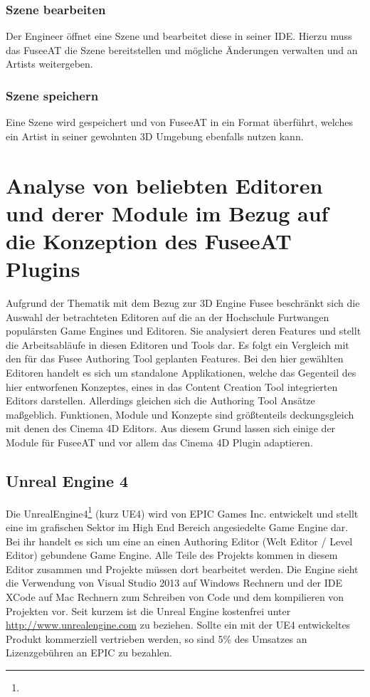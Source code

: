 \documentclass[pagesize, paper=a4, fontsize=12pt, titlepage=true, headings=small, headnosepline, abstractoff, liststotoc, nochapterprefix, plainheadsepline, twoside]{scrreprt}
\begin{document}
\subsubsection{Szene bearbeiten}
Der Engineer öffnet eine Szene und bearbeitet diese in seiner IDE. Hierzu muss das FuseeAT die Szene bereitstellen und mögliche Änderungen verwalten und an Artists weitergeben.

\subsubsection{Szene speichern}
Eine Szene wird gespeichert und von FuseeAT in ein Format überführt, welches ein Artist in seiner gewohnten 3D Umgebung ebenfalls nutzen kann.

\section{Analyse von beliebten Editoren und derer Module im Bezug auf die Konzeption des FuseeAT Plugins}
Aufgrund der Thematik mit dem Bezug zur 3D Engine Fusee beschränkt sich die Auswahl der betrachteten Editoren auf die an der Hochschule Furtwangen populärsten Game Engines und Editoren. Sie analysiert deren Features und stellt die Arbeitsabläufe in diesen Editoren und Tools dar. Es folgt ein Vergleich mit den für das Fusee Authoring Tool geplanten Features. Bei den hier gewählten Editoren handelt es sich um standalone Applikationen, welche das Gegenteil des hier entworfenen Konzeptes, eines in das Content Creation Tool integrierten Editors darstellen. Allerdings gleichen sich die Authoring Tool Ansätze maßgeblich. Funktionen, Module und Konzepte sind größtenteils deckungsgleich mit denen des Cinema 4D Editors. Aus diesem Grund lassen sich einige der Module für FuseeAT und vor allem das Cinema 4D Plugin adaptieren.

\subsection{Unreal Engine 4}
Die UnrealEngine4\footnote{} (kurz UE4) wird von EPIC Games Inc. entwickelt und stellt eine im grafischen Sektor im High End Bereich angesiedelte Game Engine dar. Bei ihr handelt es sich um eine an einen Authoring Editor (Welt Editor / Level Editor) gebundene Game Engine. Alle Teile des Projekts kommen in diesem Editor zusammen und Projekte müssen dort bearbeitet werden. Die Engine sieht die Verwendung von Visual Studio 2013 auf Windows Rechnern und der IDE XCode auf Mac Rechnern zum Schreiben von Code und dem kompilieren von Projekten vor. Seit kurzem ist die Unreal Engine kostenfrei unter \url{http://www.unrealengine.com} zu beziehen. Sollte ein mit der UE4 entwickeltes Produkt kommerziell vertrieben werden, so sind 5\% des Umsatzes an Lizenzgebühren an EPIC zu bezahlen.
\end{document}
